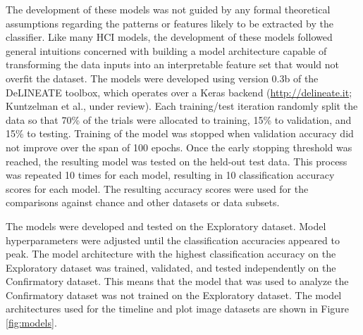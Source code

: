 \documentclass[
  english,
  man, donotrepeattitle,floatsintext]{apa6}
\begin{document}
The development of these models was not guided by any formal theoretical assumptions regarding the patterns or features likely to be extracted by the classifier. Like many HCI models, the development of these models followed general intuitions concerned with building a model architecture capable of transforming the data inputs into an interpretable feature set that would not overfit the dataset. The models were developed using version 0.3b of the DeLINEATE toolbox, which operates over a Keras backend (\url{http://delineate.it}; Kuntzelman et al., under review). Each training/test iteration randomly split the data so that 70\% of the trials were allocated to training, 15\% to validation, and 15\% to testing. Training of the model was stopped when validation accuracy did not improve over the span of 100 epochs. Once the early stopping threshold was reached, the resulting model was tested on the held-out test data. This process was repeated 10 times for each model, resulting in 10 classification accuracy scores for each model. The resulting accuracy scores were used for the comparisons against chance and other datasets or data subsets.

The models were developed and tested on the Exploratory dataset. Model hyperparameters were adjusted until the classification accuracies appeared to peak. The model architecture with the highest classification accuracy on the Exploratory dataset was trained, validated, and tested independently on the Confirmatory dataset. This means that the model that was used to analyze the Confirmatory dataset was not trained on the Exploratory dataset. The model architectures used for the timeline and plot image datasets are shown in Figure \ref{fig:models}.
\end{document}
